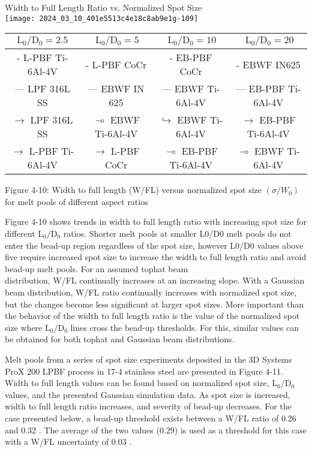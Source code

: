 \documentclass[10pt]{article}
\begin{document}
Width to Full Length Ratio vs. Normalized Spot Size\\
\texttt{[image: 2024\_03\_10\_401e5513c4e18c8ab9e1g-109]}

\begin{center}
\begin{tabular}{|c|c|c|c|}
\hline
$\mathrm{L}_{0} / \mathrm{D}_{0}=2.5$ & $\mathrm{~L}_{0} / \mathrm{D}_{0}=5$ & $\mathrm{~L}_{0} / \mathrm{D}_{0}=10$ & $\mathrm{~L}_{0} / \mathrm{D}_{0}=20$ \\
\hline
- L-PBF Ti-6Al-4V & - L-PBF CoCr & - EB-PBF CoCr & - EBWF IN625 \\
\hline
— LPF 316L SS & — EBWF IN 625 & — EBWF Ti-6Al-4V & — EB-PBF Ti-6Al-4V \\
\hline
$\rightarrow$ LPF 316L SS & $\multimap$ EBWF Ti-6Al-4V & $\hookrightarrow$ EBWF Ti-6Al-4V & $\rightarrow$ EB-PBF Ti-6Al-4V \\
\hline
$\rightarrow$ L-PBF Ti-6Al-4V & $\rightarrow$ L-PBF CoCr & $\multimap$ EB-PBF Ti-6Al-4V & $\multimap$ EBWF Ti-6Al-4V \\
\hline
\end{tabular}
\end{center}

Figure 4-10: Width to full length (W/FL) versus normalized spot size $\left(\sigma / W_{0}\right)$ for melt pools of different aspect ratios

Figure 4-10 shows trends in width to full length ratio with increasing spot size for different $\mathrm{L}_{0} / \mathrm{D}_{0}$ ratios. Shorter melt pools at smaller L0/D0 melt pools do not enter the bead-up region regardless of the spot size, however L0/D0 values above five require increased spot size to increase the width to full length ratio and avoid bead-up melt pools. For an assumed tophat beam\\
distribution, W/FL continually increases at an increasing slope. With a Gaussian beam distribution, W/FL ratio continually increases with normalized spot size, but the changes become less significant at larger spot sizes. More important than the behavior of the width to full length ratio is the value of the normalized spot size where $\mathrm{L}_{0} / \mathrm{D}_{0}$ lines cross the bead-up thresholds. For this, similar values can be obtained for both tophat and Gaussian beam distributions.

Melt pools from a series of spot size experiments deposited in the 3D Systems ProX 200 LPBF process in 17-4 stainless steel are presented in Figure 4-11. Width to full length values can be found based on normalized spot size, $\mathrm{L}_{0} / \mathrm{D}_{0}$ values, and the presented Gaussian simulation data. As spot size is increased, width to full length ratio increases, and severity of bead-up decreases. For the case presented below, a bead-up threshold exists between a W/FL ratio of 0.26 and 0.32 . The average of the two values (0.29) is used as a threshold for this case with a W/FL uncertainty of 0.03 .
\end{document}
